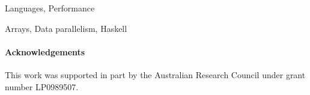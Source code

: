 \documentclass{sigplanconf}
\begin{document}
\terms
	Languages, Performance

\keywords
	Arrays, Data parallelism, Haskell












\paragraph{Acknowledgements}
This work was supported in part by the Australian Research Council under grant number LP0989507.





\appendix
%
% 
\end{document}
